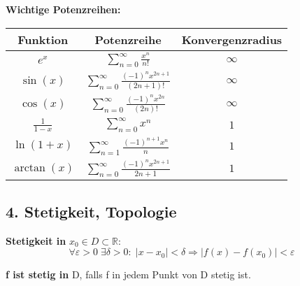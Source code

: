 \textbf{Wichtige Potenzreihen:}
\begin{tabular}{|c|c|c|}
\hline
Funktion & Potenzreihe & Konvergenzradius \\
\hline
\( e^x \) & \( \sum\limits_{n=0}^\infty \frac{x^n}{n!} \) & \( \infty \) \\
\hline
\( \sin(x) \) & \( \sum\limits_{n=0}^\infty \frac{(-1)^n x^{2n+1}}{(2n+1)!} \) & \( \infty \) \\
\hline
\( \cos(x) \) & \( \sum\limits_{n=0}^\infty \frac{(-1)^n x^{2n}}{(2n)!} \) & \( \infty \) \\
\hline
\( \frac{1}{1 - x} \) & \( \sum\limits_{n=0}^\infty x^n \) & \( 1 \) \\
\hline
\( \ln(1 + x) \) & \( \sum\limits_{n=1}^\infty \frac{(-1)^{n+1} x^n}{n} \) & \( 1 \) \\
\hline
\( \arctan(x) \) & \( \sum\limits_{n=0}^\infty \frac{(-1)^n x^{2n+1}}{2n+1} \) & \( 1 \) \\
\hline
\end{tabular}



\subsection{4. Stetigkeit, Topologie}
\textbf{Stetigkeit in } $x_0 \in D \subset \mathbb{R}$:  
\[
\forall \varepsilon > 0\; \exists \delta > 0:\; |x - x_0| < \delta \Rightarrow |f(x) - f(x_0)| < \varepsilon
\]

\textbf{f ist stetig in } D, falls f in jedem Punkt von D stetig ist.

